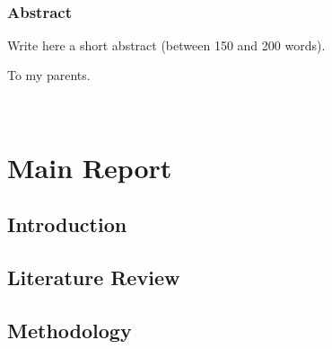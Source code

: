 \documentclass[11pt,english,a4paper,hidelinks]{book}
\begin{document}
\renewcommand{\listtablename}{List of Tables} 
\renewcommand{\tablename}{Table} 

 

\newpage
\thispagestyle{empty}\ \\
\newpage
\thispagestyle{empty}

\section*{Abstract}
\noindent Write here a short abstract (between 150 and 200 words).

\newpage
\thispagestyle{empty}
\vfill
\begin{flushright}
To my parents.
\end{flushright}
\vfill\vfill

\newpage
\thispagestyle{empty}
\ \\
\tableofcontents
\newpage

\listoffigures
\newpage

\listoftables
\newpage



\thispagestyle{empty}
\setcounter{page}{-2}

\part{Main Report}

\chapter{Introduction}

\chapter{Literature Review}

\chapter{Methodology}
\end{document}
